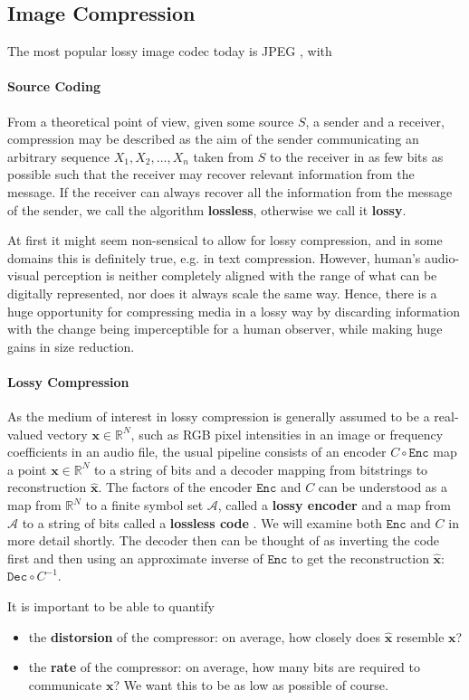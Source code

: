 \documentclass{article}
\renewcommand{\vec}[1]{\mathbf{#1}}
\newcommand{\A}{\mathcal{A}}
\newcommand{\Enc}{\mathtt{Enc}}
\newcommand{\Dec}{\mathtt{Dec}}
\newcommand{\Reals}{\mathbb{R}}
\begin{document}
\subsection{Image Compression}
\par
The most popular lossy image codec today is JPEG \cite{bull2014communicating},
with 
\paragraph{Source Coding}
From a theoretical point of view, given some source $S$, a sender and a
receiver, compression may be described as the aim of the sender communicating an
arbitrary sequence $X_1, X_2, \hdots, X_n$ taken from $S$ to the receiver in as few bits
as possible such that the receiver may recover relevant information from the message.
If the receiver can always recover all the information from the message of the sender, we
call the algorithm \textbf{lossless}, otherwise we call it \textbf{lossy}. 
\par
At first it might seem non-sensical to allow for lossy compression, and in some
domains this is definitely true, e.g. in text compression. However, 
human's audio-visual perception is neither completely aligned with the range of
what can be digitally represented, nor does it always scale the same way. Hence,
there is a huge opportunity for compressing media in a lossy way by discarding
information with the change being imperceptible for a human observer, while
making huge gains in size reduction.
\paragraph{Lossy Compression}
As the medium of interest in lossy compression is generally assumed to be a
real-valued vectory $\vec{x} \in \Reals^N$, such as RGB pixel intensities in an
image or frequency coefficients in an audio file, the usual pipeline consists of 
an encoder $C \circ \Enc$ map a point $\vec{x} \in \Reals^N$ to a string of bits and a
decoder mapping from bitstrings to reconstruction $\vec{\hat{x}}$. The
factors of the encoder $\Enc$ and $C$ can be understood as a map from $\Reals^N$ to a
finite symbol set $\A$, called a \textbf{lossy encoder} and a map from $\A$ to a
string of bits called a \textbf{lossless code} \cite{goyal2001theoretical}.
We will examine both $\Enc$ and $C$ in more detail shortly. The decoder then can be
thought of as inverting the code first and then using an approximate inverse of
$\Enc$ to get the reconstruction $\vec{\hat{x}}$: $\Dec \circ C^{-1}$.
\par
It is important to be able to quantify
\begin{itemize}
\item the \textbf{distorsion} of the compressor: on average, how closely does
  $\vec{\hat{x}}$ resemble $\vec{x}$?
\item the \textbf{rate} of the compressor: on average, how many bits are
  required to communicate $\vec{x}$? We want this to be as low as possible of course.
\end{itemize}
\end{document}
